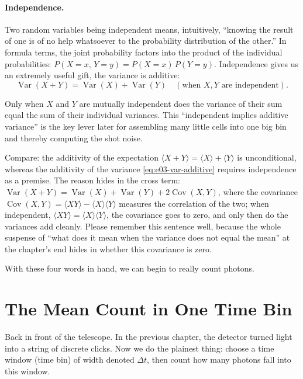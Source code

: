 \paragraph{Independence.}
Two random variables being independent means, intuitively, ``knowing the result of one is of no help whatsoever to the probability distribution of the other.'' In formula terms, the joint probability factors into the product of the individual probabilities: $P(X=x,\,Y=y)=P(X=x)\,P(Y=y)$. Independence gives us an extremely useful gift, the variance is additive:
\begin{equation}
  \operatorname{Var}(X+Y)=\operatorname{Var}(X)+\operatorname{Var}(Y)
  \quad(\text{when }X,Y\text{ are independent}).
  \label{eq:e03-var-additive}
\end{equation}
\begin{formulaexplain}
Only when $X$ and $Y$ are mutually independent does the variance of their sum equal the sum of their individual variances. This ``independent implies additive variance'' is the key lever later for assembling many little cells into one big bin and thereby computing the shot noise.
\end{formulaexplain}
Compare: the additivity of the expectation $\langle X+Y\rangle=\langle X\rangle+\langle Y\rangle$ is unconditional, whereas the additivity of the variance \eqref{eq:e03-var-additive} requires independence as a premise. The reason hides in the cross term: $\operatorname{Var}(X+Y)=\operatorname{Var}(X)+\operatorname{Var}(Y)+2\operatorname{Cov}(X,Y)$, where the covariance $\operatorname{Cov}(X,Y)=\langle XY\rangle-\langle X\rangle\langle Y\rangle$ measures the correlation of the two; when independent, $\langle XY\rangle=\langle X\rangle\langle Y\rangle$, the covariance goes to zero, and only then do the variances add cleanly. Please remember this sentence well, because the whole suspense of ``what does it mean when the variance does not equal the mean'' at the chapter's end hides in whether this covariance is zero.

With these four words in hand, we can begin to really count photons.

\section{The Mean Count in One Time Bin}
\label{sec:e03-mean}

Back in front of the telescope. In the previous chapter, the detector turned light into a string of discrete clicks. Now we do the plainest thing: choose a time window (time bin) of width denoted $\Delta t$, then count how many photons fall into this window.

